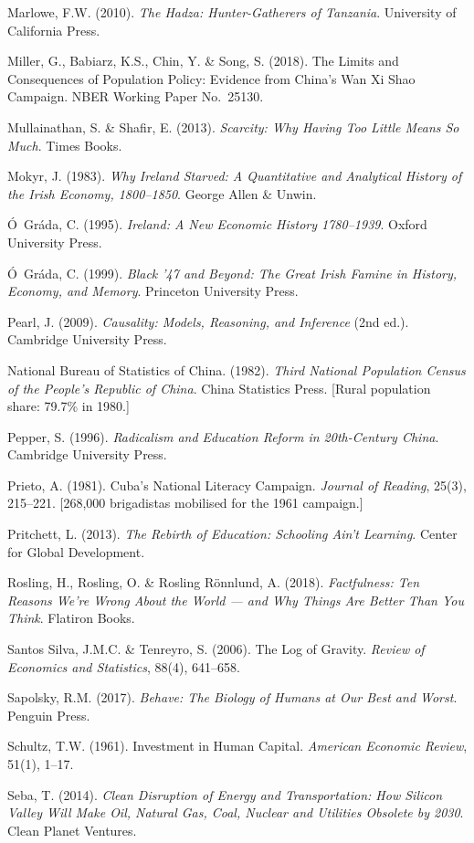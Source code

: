 \documentclass[12pt,letterpaper]{article}
\begin{document}
Marlowe, F.W. (2010). \emph{The Hadza: Hunter-Gatherers of Tanzania}.
University of California Press.

Miller, G., Babiarz, K.S., Chin, Y. \& Song, S. (2018). The Limits and
Consequences of Population Policy: Evidence from China's Wan Xi Shao
Campaign. NBER Working Paper No.~25130.

Mullainathan, S. \& Shafir, E. (2013). \emph{Scarcity: Why Having Too
Little Means So Much}. Times Books.

Mokyr, J. (1983). \emph{Why Ireland Starved: A Quantitative and
Analytical History of the Irish Economy, 1800--1850}. George Allen
\& Unwin.

Ó~Gráda, C. (1995). \emph{Ireland: A New Economic History
1780--1939}. Oxford University Press.

Ó~Gráda, C. (1999). \emph{Black '47 and Beyond: The Great Irish
Famine in History, Economy, and Memory}. Princeton University Press.

Pearl, J. (2009). \emph{Causality: Models, Reasoning, and Inference}
(2nd ed.). Cambridge University Press.

National Bureau of Statistics of China. (1982). \emph{Third National
Population Census of the People's Republic of China}. China Statistics
Press. {[}Rural population share: 79.7\% in 1980.{]}

Pepper, S. (1996). \emph{Radicalism and Education Reform in 20th-Century
China}. Cambridge University Press.

Prieto, A. (1981). Cuba's National Literacy Campaign. \emph{Journal of
Reading}, 25(3), 215--221. {[}268,000 brigadistas mobilised for the 1961
campaign.{]}

Pritchett, L. (2013). \emph{The Rebirth of Education: Schooling Ain't
Learning}. Center for Global Development.

Rosling, H., Rosling, O. \& Rosling R\"{o}nnlund, A. (2018).
\emph{Factfulness: Ten Reasons We're Wrong About the World --- and
Why Things Are Better Than You Think}. Flatiron Books.

Santos Silva, J.M.C. \& Tenreyro, S. (2006). The Log of Gravity.
\emph{Review of Economics and Statistics}, 88(4), 641--658.

Sapolsky, R.M. (2017). \emph{Behave: The Biology of Humans at Our
Best and Worst}. Penguin Press.

Schultz, T.W. (1961). Investment in Human Capital.
\emph{American Economic Review}, 51(1), 1--17.

Seba, T. (2014). \emph{Clean Disruption of Energy and Transportation:
How Silicon Valley Will Make Oil, Natural Gas, Coal, Nuclear and
Utilities Obsolete by 2030}. Clean Planet Ventures.
\end{document}
